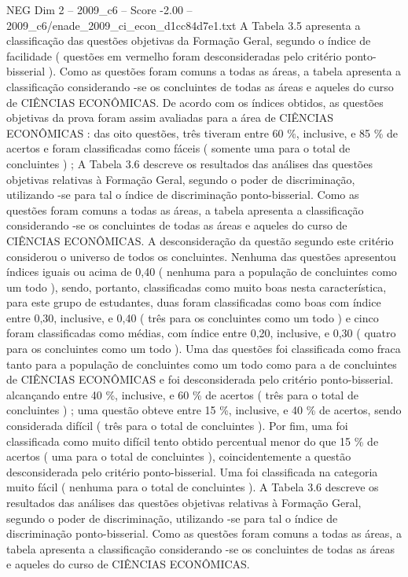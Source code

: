 \begin{textsample}{NEG Dim 2 – 2009\_c6 – Score -2.00 – 2009\_c6/enade\_2009\_ci\_econ\_d1cc84d7e1.txt}
A Tabela 3.5 apresenta a classificação das questões objetivas da Formação Geral, segundo o índice de facilidade ( questões em vermelho foram desconsideradas pelo critério ponto-bisserial ).
Como as questões foram comuns a todas as áreas, a tabela apresenta a classificação considerando -se os concluintes de todas as áreas e aqueles do curso de CIÊNCIAS ECONÔMICAS.
De acordo com os índices obtidos, as questões objetivas da prova foram assim avaliadas para a área de CIÊNCIAS ECONÔMICAS : das oito questões, três tiveram entre 60 \%, inclusive, e 85 \% de acertos e foram classificadas como fáceis ( somente uma para o total de concluintes ) ; A Tabela 3.6 descreve os resultados das análises das questões objetivas relativas à Formação Geral, segundo o poder de discriminação, utilizando -se para tal o índice de discriminação ponto-bisserial.
Como as questões foram comuns a todas as áreas, a tabela apresenta a classificação considerando -se os concluintes de todas as áreas e aqueles do curso de CIÊNCIAS ECONÔMICAS.
A desconsideração da questão segundo este critério considerou o universo de todos os concluintes.
Nenhuma das questões apresentou índices iguais ou acima de 0,40 ( nenhuma para a população de concluintes como um todo ), sendo, portanto, classificadas como muito boas nesta característica, para este grupo de estudantes, duas foram classificadas como boas com índice entre 0,30, inclusive, e 0,40 ( três para os concluintes como um todo ) e cinco foram classificadas como médias, com índice entre 0,20, inclusive, e 0,30 ( quatro para os concluintes como um todo ).
Uma das questões foi classificada como fraca tanto para a população de concluintes como um todo como para a de concluintes de CIÊNCIAS ECONÔMICAS e foi desconsiderada pelo critério ponto-bisserial. alcançando entre 40 \%, inclusive, e 60 \% de acertos ( três para o total de concluintes ) ; uma questão obteve entre 15 \%, inclusive, e 40 \% de acertos, sendo considerada difícil ( três para o total de concluintes ).
Por fim, uma foi classificada como muito difícil tento obtido percentual menor do que 15 \% de acertos ( uma para o total de concluintes ), coincidentemente a questão desconsiderada pelo critério ponto-bisserial.
Uma foi classificada na categoria muito fácil ( nenhuma para o total de concluintes ).
A Tabela 3.6 descreve os resultados das análises das questões objetivas relativas à Formação Geral, segundo o poder de discriminação, utilizando -se para tal o índice de discriminação ponto-bisserial.
Como as questões foram comuns a todas as áreas, a tabela apresenta a classificação considerando -se os concluintes de todas as áreas e aqueles do curso de CIÊNCIAS ECONÔMICAS.

\end{textsample}
